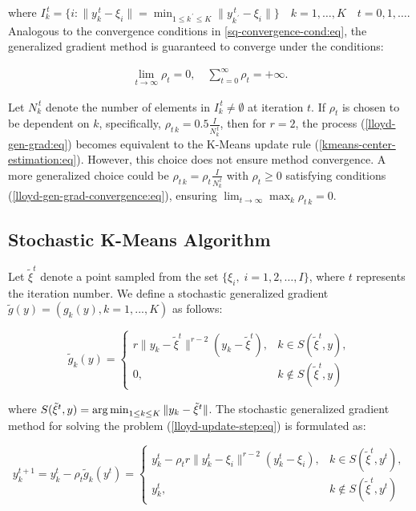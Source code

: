 \noindent where $I_k^{\,t} = \{i: \| y_k^{\,t} - \xi_i \| = \min_{1 \leq  k^{\,\prime} \leq K} \| y_{k^{\,\prime}}^{\,t}-\xi_i \| \} \quad k = 1 , \ldots , K \quad t = 0, 1 , \ldots$. Analogous to the convergence conditions in \ref{sq-convergence-cond:eq}, the generalized gradient method is guaranteed to converge under the conditions:

\begin{eqnarray}
    \label{lloyd-gen-grad-convergence:eq}
    \lim_{t\rightarrow\infty}\rho_t=0,\quad\sum_{t=0}^\infty\rho_t=+\infty.
\end{eqnarray}

Let $N_k^{\,t}$ denote the number of elements in $I_k^{\,t} \neq \emptyset$ at iteration $t$. If $\rho_t$ is chosen to be dependent on $k$, specifically, $\rho_{t\,k} = 0.5 \frac{I}{N_k^{\,t}}$, then for $r=2$, the process (\ref{lloyd-gen-grad:eq}) becomes equivalent to the K-Means update rule (\ref{kmeans-center-estimation:eq}). However, this choice does not ensure method convergence. A more generalized choice could be $\rho_{t\,k} = \rho_t \frac{I}{N_k^{\,t}}$ with $\rho_t \geq 0$ satisfying conditions (\ref{lloyd-gen-grad-convergence:eq}), ensuring $\lim_{t \to \infty} \max_k \rho_{t\,k} = 0$.

\subsection{Stochastic K-Means Algorithm}

Let $\tilde{\xi}^t$ denote a point sampled from the set $\{\xi_i,\;i=1,2,\ldots,I\}$, where $t$ represents the iteration number. We define a stochastic generalized gradient $\tilde{g}(y) = (g_k(y), k = 1, ..., K)$ as follows:

\begin{equation}
    \label{stoch-lloyd-grad-component:eq}
    \tilde{g}_k(y) = \begin{cases}
        r\|y_{k} - \tilde{\xi}^t\|^{r-2} (y_{k} - \tilde{\xi}^t), & k \in S(\tilde{\xi}^t,y),\\
        0, & k \notin S(\tilde{\xi}^t,y)
    \end{cases}
\end{equation}

\noindent where $S(\tilde{\xi}^t,y) = \operatorname*{arg\,min}_{1 \leq k \leq K} \| y_k - \tilde{\xi}^t \|$. The stochastic generalized gradient method for solving the problem (\ref{lloyd-update-step:eq}) is formulated as:

\begin{equation}
    \label{stoch-lloyd-gen-grad:eq}
    y_k^{t+1} = y_k^t - \rho_t \tilde{g}_k(y^t) = \begin{cases}
        y_k^t - \rho_t r\|y_k^t - \xi_i\|^{r-2}(y_k^t - \xi_i), & k \in S(\tilde{\xi}^t,y^t), \\
        y_k^t, & k \notin S(\tilde{\xi}^t,y^t)
    \end{cases}
\end{equation}


